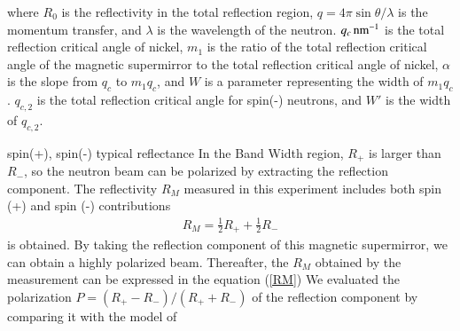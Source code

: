 \documentclass{jps-cp}
\begin{document}

 where $R_0$ is the reflectivity in the total reflection region, $q=4\pi \sin \theta/\lambda$ is the momentum transfer, and $\lambda$ is the wavelength of the neutron.
$q_c\,\rm nm^{-1}$ is the total reflection critical angle of nickel, $m_1$ is the ratio of the total reflection critical angle of the magnetic supermirror to the total reflection critical angle of nickel, $\alpha$ is the slope from $q_c$ to $m_1 q_c$, and $W$ is a parameter representing the width of $m_1 q_c$.
$q_{c,2}$ is the total reflection critical angle for spin(-) neutrons, and $W'$ is the width of $q_{c,2}$.

spin(+), spin(-) typical reflectance %
In the Band Width region, $R_+$ is larger than $R_-$, so the neutron beam can be polarized by extracting the reflection component.
The reflectivity $R_M$ measured in this experiment includes both spin (+) and spin (-) contributions 
\begin{align}
R_M=\frac{1}{2} R_{+}+\frac{1}{2} R_{-} 
\label{RM}
\end{align}
is obtained. By taking the reflection component of this magnetic supermirror, we can obtain a highly polarized beam. Thereafter, the $R_M$ obtained by the measurement can be expressed in the equation (\ref{RM})
We evaluated the polarization $P=(R_{+}-R_{-})/(R_{+}+R_{-})$ of the reflection component by comparing it with the model of
\end{document}
